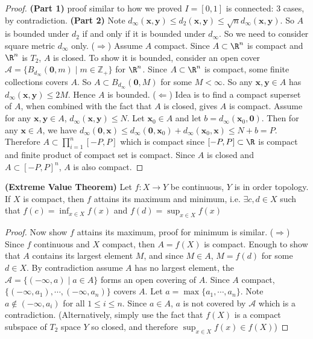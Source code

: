 \documentclass[10.5pt]{article}
\newcommand{\Z}{\mathbb{Z}}
\newcommand{\calA}{\mathcal{A}}
\newcommand{\bx}{\mathbf{x}}
\newcommand{\by}{\mathbf{y}}
\begin{document}
\begin{theorem*}
\begin{proof}
        \textbf{(Part 1)} proof similar to how we proved $I=[0,1]$ is connected: 3 cases, by contradiction. \textbf{(Part 2)} Note $d_{\infty}(\bx,\by)\leq d_{2}(\bx,\by) \leq \sqrt{n} d_{\infty}(\bx,\by)$. So $A$ is bounded under $d_{2}$ if and only if it is bounded under $d_{\infty}$. So we need to consider square metric $d_{\infty}$ only. ($\Rightarrow$) Assume $A$ compact. Since $A\subset \R^n$ is compact and $\R^n$ is $T_2$, $A$ is closed. To show it is bounded, consider an open cover $\calA = \{B_{d_{\infty}}(\mathbf{0}, m) \mid m\in \Z_+\}$ for $\R^n$. Since $A\subset \R^n$ is compact, some finite collections covers $A$. So $A\subset B_{d_{\infty}}(\mathbf{0}, M)$ for some $M<\infty$. So any $\bx,\by\in A$ has $d_{\infty}(\bx,\by) \leq 2M$. Hence $A$ is bounded. ($\Leftarrow$) Idea is to find a compact superset of $A$, when combined with the fact that $A$ is closed, gives $A$ is compact. Assume for any $\bx,\by\in A$, $d_{\infty}(\bx,\by)\leq N$. Let $\bx_0\in A$ and let $b = d_{\infty}(\bx_0,\mathbf{0})$. Then for any $\bx\in A$, we have $d_{\infty}(\mathbf{0}, \bx) \leq d_{\infty}(\mathbf{0}, \bx_0) + d_{\infty}(\bx_0, \bx) \leq N + b = P$. Therefore $A\subset \textstyle \prod_{i=1}^n [-P,P]$ which is compact since $[-P,P]\subset\R$ is compact and finite product of compact set is compact. Since $A$ is closed and $A\subset [-P,P]^n$, $A$ is also compact.
    \end{proof}
\end{theorem*}

\begin{theorem*}
    \textbf{(Extreme Value Theorem)} Let $f:X\to Y$ be continuous, $Y$ is in order topology. If $X$ is compact, then $f$ attains its maximum and minimum, i.e. $\exists c,d\in X$ such that $f(c) = \textstyle\inf_{x\in X} f(x)$ and $f(d) =\textstyle\sup_{x\in X} f(x)$
    \begin{proof}
        Now show $f$ attains its maximum, proof for minimum is similar.
        ($\Rightarrow$) Since $f$ continuous and $X$ compact, then $A = f(X)$ is compact. Enough to show that $A$ contains its largest element $M$, and since $M\in A$, $M=f(d)$ for some $d\in X$. By contradiction assume $A$ has no largest element, the $\calA = \{(-\infty, a) \mid a\in A \}$ forms an open covering of $A$. Since $A$ compact, $\{(-\infty, a_1),\cdots,(-\infty, a_n)\}$ covers $A$. Let $a = \max \{a_1, \cdots, a_n\}$. Note $a\not\in (-\infty, a_i)$ for all $1\leq i \leq n$. Since $a\in A$, $a$ is not covered by $\calA$ which is a contradiction. (Alternatively, simply use the fact that $f(X)$ is a compact subspace of $T_2$ space $Y$ so closed, and therefore $\textstyle\sup_{x\in X} f(x) \in f(X)$)
    \end{proof}
\end{theorem*}
 
\end{document}

